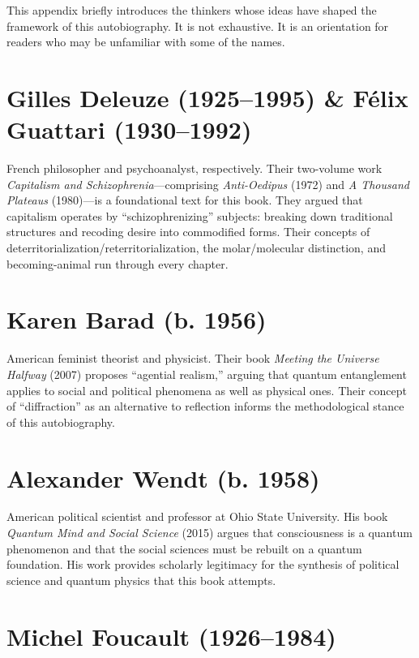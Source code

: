 \documentclass[11pt,openany]{book}
\begin{document}
This appendix briefly introduces the thinkers whose ideas have shaped the framework of this autobiography. It is not exhaustive. It is an orientation for readers who may be unfamiliar with some of the names.

\section*{Gilles Deleuze (1925--1995) \& F\'elix Guattari (1930--1992)}

French philosopher and psychoanalyst, respectively. Their two-volume work \textit{Capitalism and Schizophrenia}---comprising \textit{Anti-Oedipus} (1972) and \textit{A Thousand Plateaus} (1980)---is a foundational text for this book. They argued that capitalism operates by ``schizophrenizing'' subjects: breaking down traditional structures and recoding desire into commodified forms. Their concepts of deterritorialization/reterritorialization, the molar/molecular distinction, and becoming-animal run through every chapter.

\section*{Karen Barad (b. 1956)}

American feminist theorist and physicist. Their book \textit{Meeting the Universe Halfway} (2007) proposes ``agential realism,'' arguing that quantum entanglement applies to social and political phenomena as well as physical ones. Their concept of ``diffraction'' as an alternative to reflection informs the methodological stance of this autobiography.

\section*{Alexander Wendt (b. 1958)}

American political scientist and professor at Ohio State University. His book \textit{Quantum Mind and Social Science} (2015) argues that consciousness is a quantum phenomenon and that the social sciences must be rebuilt on a quantum foundation. His work provides scholarly legitimacy for the synthesis of political science and quantum physics that this book attempts.

\section*{Michel Foucault (1926--1984)}
\end{document}
